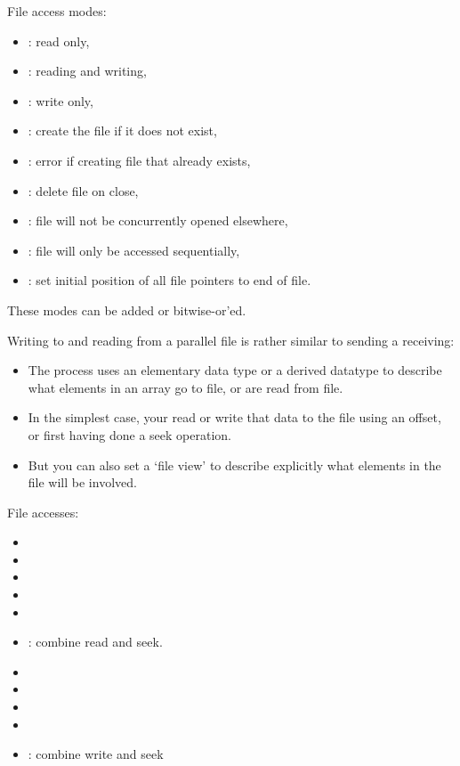 File access modes:
\begin{itemize}
\item  {}: read only,
\item  {}: reading and writing,
\item  {}: write only,
\item  {}: create the file if it does not exist,
\item  {}: error if creating file that already exists,
\item  {}: delete file on close,
\item  {}: file will not be concurrently opened
  elsewhere,
\item  {}: file will only be accessed sequentially,
\item  {}: set initial position of all file pointers to end
  of file.
\end{itemize}
These modes can be added or bitwise-or'ed.

Writing to and reading from a parallel file is rather similar to
sending a receiving:
\begin{itemize}
\item The process uses an elementary data type or a derived datatype
  to describe what elements in an array go to file, or are read from
  file.
\item In the simplest case, your read or write that data to the file using an
  offset, or first having done a seek operation.
\item But you can also set a `file view' to describe explicitly what
  elements in the file will be involved.
\end{itemize}

File accesses:
\begin{itemize}
\item {}
\item {}
\item {}
\item {}
\item {}
\item {}: combine read and seek.
\item {}
\item {}
\item {}
\item {}
\item {}: combine write and seek
\end{itemize}

